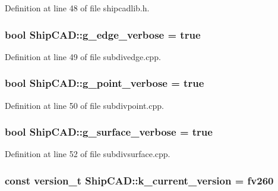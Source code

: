 Definition at line 48 of file shipcadlib.\-h.

\hypertarget{namespaceShipCAD_ad5a157bd082e37a863f05b7c54a1d7cc}{
\subsubsection[{g\-\_\-edge\-\_\-verbose}]{\setlength{\rightskip}{0pt plus 5cm}bool Ship\-C\-A\-D\-::g\-\_\-edge\-\_\-verbose = true}}\label{namespaceShipCAD_ad5a157bd082e37a863f05b7c54a1d7cc}


Definition at line 49 of file subdivedge.\-cpp.

\hypertarget{namespaceShipCAD_ae059a88fbc18c56ceee2fd1cd7f2aad0}{
\subsubsection[{g\-\_\-point\-\_\-verbose}]{\setlength{\rightskip}{0pt plus 5cm}bool Ship\-C\-A\-D\-::g\-\_\-point\-\_\-verbose = true}}\label{namespaceShipCAD_ae059a88fbc18c56ceee2fd1cd7f2aad0}


Definition at line 50 of file subdivpoint.\-cpp.

\hypertarget{namespaceShipCAD_a45538d3cd2c9293bf0bd4b09a23670ac}{
\subsubsection[{g\-\_\-surface\-\_\-verbose}]{\setlength{\rightskip}{0pt plus 5cm}bool Ship\-C\-A\-D\-::g\-\_\-surface\-\_\-verbose = true}}\label{namespaceShipCAD_a45538d3cd2c9293bf0bd4b09a23670ac}


Definition at line 52 of file subdivsurface.\-cpp.

\hypertarget{namespaceShipCAD_aa3415e1acf9bdb19e24f31f5138d6a60}{
\subsubsection[{k\-\_\-current\-\_\-version}]{\setlength{\rightskip}{0pt plus 5cm}const {\bf version\-\_\-t} Ship\-C\-A\-D\-::k\-\_\-current\-\_\-version = {\bf fv260}}}\label{namespaceShipCAD_aa3415e1acf9bdb19e24f31f5138d6a60}


